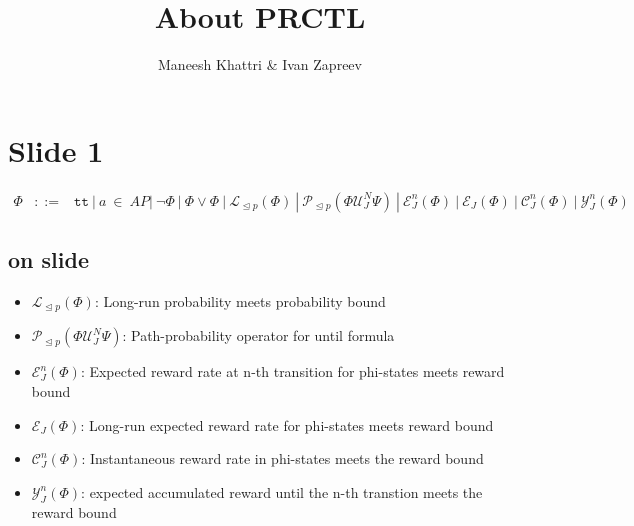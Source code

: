 \documentclass[a4paper,12pt]{article}
\begin{document}
\title{About PRCTL}
\author{Maneesh Khattri \& Ivan Zapreev}
\date{}
\maketitle{}

\section{Slide 1}

\begin{eqnarray*}
\Phi &::=& \mathtt{tt}\ |\ a\ \in\ AP|\ \lnot \Phi\ |\ \Phi \vee \Phi\ |\ \mathcal{L}_{\trianglelefteq p}(\Phi)\ |\ \mathcal{P}_{\trianglelefteq p}(\Phi \mathcal{U}_{J}^{N}\Psi)\ |\ \mathcal{E}^{n}_{J}(\Phi)\ |\ \mathcal{E}_{J}(\Phi)\ 
|\ \mathcal{C}^{n}_{J}(\Phi)\ |\ \mathcal{Y}^{n}_{J}(\Phi)
\end{eqnarray*}
\subsection{on slide}
\begin{itemize}
\item $\mathcal{L}_{\trianglelefteq p}(\Phi)$: Long-run probability meets probability bound
\item $\mathcal{P}_{\trianglelefteq p}(\Phi \mathcal{U}_{J}^{N}\Psi)$: Path-probability operator for until formula
\item $\mathcal{E}^{n}_{J}(\Phi)$: Expected reward rate at n-th transition for phi-states meets reward bound
\item $\mathcal{E}_{J}(\Phi)$: Long-run expected reward rate for phi-states meets reward bound
\item $\mathcal{C}^{n}_{J}(\Phi)$: Instantaneous reward rate in phi-states meets the reward bound
\item $\mathcal{Y}^{n}_{J}(\Phi)$: expected accumulated reward until the n-th transtion meets the reward bound
\end{itemize}
\end{document}
